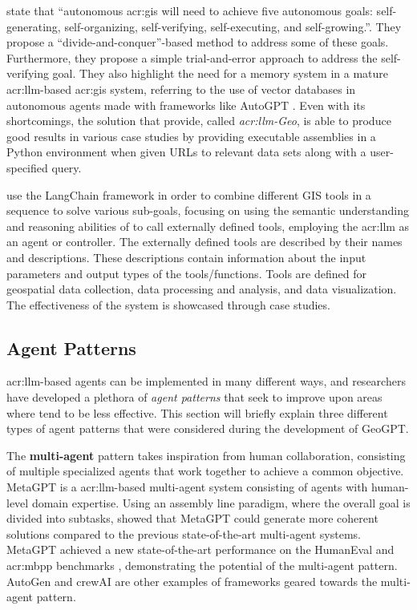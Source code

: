 \cite{liAutonomousGISNextgeneration2023} state that \enquote{autonomous \acrshort{acr:gis} will need to achieve five autonomous goals: self-generating, self-organizing, self-verifying, self-executing, and self-growing.}. They propose a \enquote{divide-and-conquer}-based method to address some of these goals. Furthermore, they propose a simple trial-and-error approach to address the self-verifying goal. They also highlight the need for a memory system in a mature \acrshort{acr:llm}-based \acrshort{acr:gis} system, referring to the use of vector databases in autonomous agents made with frameworks like AutoGPT \citep{richardAutoGPTHeartOpensource2023}. Even with its shortcomings, the solution that \cite{liAutonomousGISNextgeneration2023} provide, called \textit{\acrshort{acr:llm}-Geo}, is able to produce good results in various case studies by providing executable assemblies in a Python environment when given URLs to relevant data sets along with a user-specified query.

\cite{zhangGeoGPTUnderstandingProcessing2023} use the LangChain framework in order to combine different GIS tools in a sequence to solve various sub-goals, focusing on using the semantic understanding and reasoning abilities of  to call externally defined tools, employing the \acrshort{acr:llm} as an agent or controller. The externally defined tools are described by their names and descriptions. These descriptions contain information about the input parameters and output types of the tools/functions. Tools are defined for geospatial data collection, data processing and analysis, and data visualization. The effectiveness of the system is showcased through case studies.


\subsection{Agent Patterns}
\label{subsec:agent-patterns}

\acrshort{acr:llm}-based agents can be implemented in many different ways, and researchers have developed a plethora of \textit{agent patterns} that seek to improve upon areas where  tend to be less effective. This section will briefly explain three different types of agent patterns that were considered during the development of GeoGPT.

The \textbf{multi-agent} pattern takes inspiration from human collaboration, consisting of multiple specialized agents that work together to achieve a common objective. MetaGPT \citep{hongMetaGPTMetaProgramming2023} is a \acrshort{acr:llm}-based multi-agent system consisting of agents with human-level domain expertise. Using an assembly line paradigm, where the overall goal is divided into subtasks, \citeauthor{hongMetaGPTMetaProgramming2023} showed that MetaGPT could generate more coherent solutions compared to the previous state-of-the-art multi-agent systems. MetaGPT achieved a new state-of-the-art performance on the HumanEval and \acrshort{acr:mbpp} benchmarks \citep[7]{hongMetaGPTMetaProgramming2023}, demonstrating the potential of the multi-agent pattern. AutoGen \citep{wuAutoGenEnablingNextGen2023a} and crewAI \citep{mouraJoaomdmouraCrewAI2024} are other examples of frameworks geared towards the multi-agent pattern.

